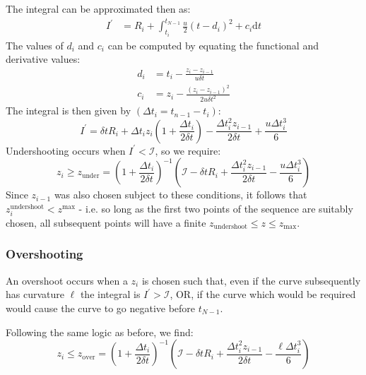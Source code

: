 \documentclass[]{article}
\begin{document}
					The integral can be approximated then as:
					\begin{align}
						I^\prime &  = R_i + \int_{t_i}^{t_{N-1}} \frac{u}{2} (t - d_i)^2 + c_i \mathrm d t
					\end{align}
					The values of $d_i$ and $c_i$ can be computed by equating the functional and derivative values:
					\begin{align}
						d_i & = t_i - \frac{z_i - z_{i-1}}{ u \delta t}
						\\
						c_i & = z_i  - \frac{(z_i - z_{i-1})^2}{2 u \delta t^2}
					\end{align}
					The integral is then given by $(\Delta t_i = t_{n-1} - t_i)$:
					\begin{equation}
						I^\prime = \delta t R_i + \Delta t_i z_i \left( 1 + \frac{\Delta t_i}{2 \delta t} \right) - \frac{\Delta t_i^2 z_{i-1}}{2 \delta t} + \frac{u \Delta t_i^3}{6}
					\end{equation}
					Undershooting occurs when $I^\prime < \mathcal{I}$, so we require:
					\begin{equation}
						z_i \geq z_\text{under} = \left(1 + \frac{\Delta t_i}{2\delta t}\right)^{-1} \left(\mathcal{I} - \delta t R_i + \frac{\Delta t_i^2 z_{i-1}}{2 \delta t} - \frac{u \Delta t_i^3}{6}\right)
					\end{equation}
					Since $z_{i-1}$ was also chosen subject to these conditions, it follows that $z_i^\text{undershoot} < z^\text{max}$ - i.e. so long as the first two points of the sequence are suitably chosen, all subsequent points will have a finite $z_\text{undershoot} \leq z \leq z_\text{max}$.


				\subsubsection{Overshooting}

					An overshoot occurs when a $z_i$ is chosen such that, even if the curve subsequently has curvature $\ell$ the integral is $I^\prime > \mathcal{I}$, OR, if the curve which would be required would cause the curve to go negative before $t_{N-1}$.

					Following the same logic as before, we find:
					\begin{equation}
						z_i \leq z_\text{over} = \left(1 + \frac{\Delta t_i}{2\delta t}\right)^{-1} \left(\mathcal{I} - \delta t R_i + \frac{\Delta t_i^2 z_{i-1}}{2 \delta t} - \frac{\ell \Delta t_i^3}{6}\right)
					\end{equation}
\end{document}
